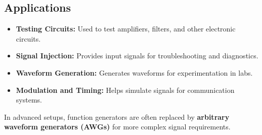 \subsection{Applications}
\begin{itemize}
    \item \textbf{Testing Circuits:} Used to test amplifiers, filters, and other electronic circuits.
    \item \textbf{Signal Injection:} Provides input signals for troubleshooting and diagnostics.
    \item \textbf{Waveform Generation:} Generates waveforms for experimentation in labs.
    \item \textbf{Modulation and Timing:} Helps simulate signals for communication systems.
\end{itemize}

In advanced setups, function generators are often replaced by \textbf{arbitrary waveform generators (AWGs)} for more complex signal requirements.
